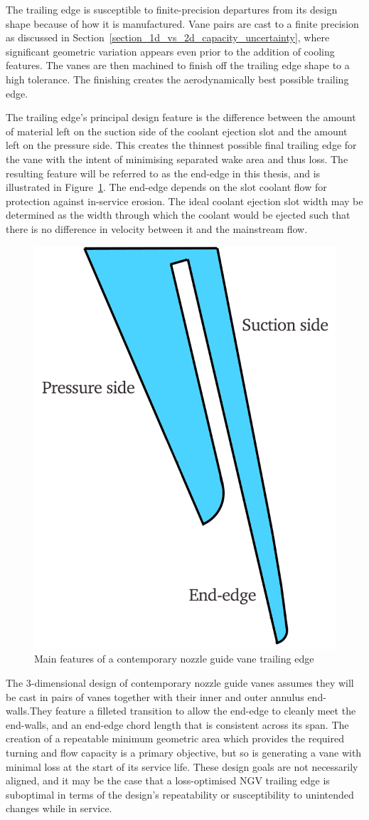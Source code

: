\documentclass[a4paper, 11pt, oneside]{report}
\begin{document}
The trailing edge is susceptible to finite-precision departures from its design shape because of how it is manufactured. Vane pairs are cast to a finite precision as discussed in Section~\ref{section_1d_vs_2d_capacity_uncertainty}, where significant geometric variation appears even prior to the addition of cooling features. The vanes are then machined to finish off the trailing edge shape to a high tolerance. The finishing creates the aerodynamically best possible trailing edge. 

The trailing edge's principal design feature is the difference between the amount of material left on the suction side of the coolant ejection slot and the amount left on the pressure side. This creates the thinnest possible final trailing edge for the vane with the intent of minimising separated wake area and thus loss. The resulting feature will be referred to as the end-edge in this thesis, and is illustrated in Figure~\ref{fig:te_features_labelled}. The end-edge depends on the slot coolant flow for protection against in-service erosion. The ideal coolant ejection slot width may be determined as the width through which the coolant would be ejected such that there is no difference in velocity between it and the mainstream flow.

\begin{figure}[H]
      \centering
      \includegraphics[width=.45\textwidth]{figs/te_features_labelled.png}
      \caption{Main features of a contemporary nozzle guide vane trailing edge}
      \label{fig:te_features_labelled}
\end{figure}

The 3-dimensional design of contemporary nozzle guide vanes assumes they will be cast in pairs of vanes together with their inner and outer annulus end-walls.They feature a filleted transition to allow the end-edge to cleanly meet the end-walls, and an end-edge chord length that is consistent across its span. The creation of a repeatable minimum geometric area which provides the required turning and flow capacity is a primary objective, but so is generating a vane with minimal loss at the start of its service life. These design goals are not necessarily aligned, and it may be the case that  a loss-optimised NGV trailing edge is suboptimal in terms of the design's repeatability or susceptibility to unintended changes while in service.
\end{document}
